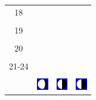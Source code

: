 \documentclass[twoside, a4paper,12pt, tikz]{scrartcl}
\begin{document}
\begin{tabularx}{\linewidth}{|c|X|X|X|}
        &   &       &    \\
      \hline
      18&   &       &    \\
        &   &       &    \\
      \hline
      19&   &       &    \\
        &   &       &    \\
      \hline
      20&   &       &    \\
        &   &       &    \\
      \hline
      21-24&   &       &    \\
        &   &       &    \\
      \hline  
      & \vspace{0.01cm} \centerline{\includegraphics[width=0.5cm]{moon_phases/Moon_phase_5.svg.png}} \vspace{0.1cm} & \vspace{0.01cm} \centerline{\includegraphics[width=0.5cm]{moon_phases/Moon_phase_6.svg.png}} \vspace{0.1cm} & \vspace{0.01cm} \centerline{\includegraphics[width=0.5cm]{moon_phases/Moon_phase_6.svg.png}} \vspace{0.1cm}\\
      \hline   
    \end{tabularx}




    \newpage

        \noindent
\end{document}
